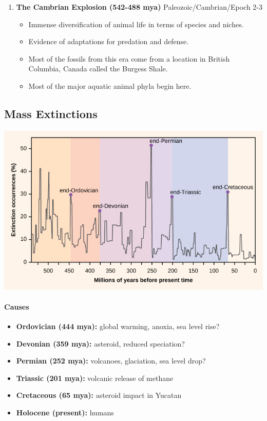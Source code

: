\documentclass[12pt]{article}
\begin{document}
\begin{enumerate}
\begin{itemize}
          \end{itemize}
    \item \textbf{The Cambrian Explosion (542-488 mya)} Paleozoic/Cambrian/Epoch 2-3
          \begin{itemize}
              \item Immense diversification of animal life in terms of species and niches.
              \item Evidence of adaptations for predation and defense.
              \item Most of the fossils from this era come from a location in British Columbia, Canada called the Burgess Shale.
              \item Most of the major aquatic animal phyla begin here.
          \end{itemize}
\end{enumerate}

\subsection{Mass Extinctions}

\begin{center}
    \includegraphics[width=\linewidth]{mass-extinction.jpeg}
\end{center}

\paragraph{Causes}
\begin{itemize}
    \item \textbf{Ordovician (444 mya):} global warming, anoxia, sea level rise?
    \item \textbf{Devonian (359 mya):} asteroid, reduced speciation?
    \item \textbf{Permian (252 mya):} volcanoes, glaciation, sea level drop?
    \item \textbf{Triassic (201 mya):} volcanic release of methane
    \item \textbf{Cretaceous (65 mya):} asteroid impact in Yucatan
    \item \textbf{Holocene (present):} humans
\end{itemize}
\end{document}

